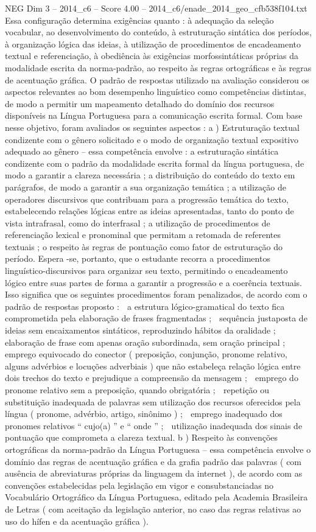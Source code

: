 \begin{textsample}{NEG Dim 3 – 2014\_c6 – Score 4.00 – 2014\_c6/enade\_2014\_geo\_cfb538f104.txt}
Essa configuração determina exigências quanto : à adequação da seleção vocabular, ao desenvolvimento do conteúdo, à estruturação sintática dos períodos, à organização lógica das ideias, à utilização de procedimentos de encadeamento textual e referenciação, à obediência às exigências morfossintáticas próprias da modalidade escrita da norma-padrão, ao respeito às regras ortográficas e às regras de acentuação gráfica.
O padrão de respostas utilizado na avaliação considerou os aspectos relevantes ao bom desempenho linguístico como competências distintas, de modo a permitir um mapeamento detalhado do domínio dos recursos disponíveis na Língua Portuguesa para a comunicação escrita formal.
Com base nesse objetivo, foram avaliados os seguintes aspectos : a ) Estruturação textual condizente com o gênero solicitado e o modo de organização textual expositivo adequado ao gênero – essa competência envolve : a estruturação sintática condizente com o padrão da modalidade escrita formal da língua portuguesa, de modo a garantir a clareza necessária ; a distribuição do conteúdo do texto em parágrafos, de modo a garantir a sua organização temática ; a utilização de operadores discursivos que contribuam para a progressão temática do texto, estabelecendo relações lógicas entre as ideias apresentadas, tanto do ponto de vista intrafrasal, como do interfrasal ; a utilização de procedimentos de referenciação lexical e pronominal que permitam a retomada de referentes textuais ; o respeito às regras de pontuação como fator de estruturação do período.
Espera -se, portanto, que o estudante recorra a procedimentos linguístico-discursivos para organizar seu texto, permitindo o encadeamento lógico entre suas partes de forma a garantir a progressão e a coerência textuais.
Isso significa que os seguintes procedimentos foram penalizados, de acordo com o padrão de respostas proposto :  a estrutura lógico-gramatical do texto fica comprometida pela elaboração de frases fragmentadas ;  sequência justaposta de ideias sem encaixamentos sintáticos, reproduzindo hábitos da oralidade ;  elaboração de frase com apenas oração subordinada, sem oração principal ;  emprego equivocado do conector ( preposição, conjunção, pronome relativo, alguns advérbios e locuções adverbiais ) que não estabeleça relação lógica entre dois trechos do texto e prejudique a compreensão da mensagem ;  emprego do pronome relativo sem a preposição, quando obrigatória ;  repetição ou substituição inadequada de palavras sem utilização dos recursos oferecidos pela língua ( pronome, advérbio, artigo, sinônimo ) ;  emprego inadequado dos pronomes relativos “ cujo(a) ” e “ onde ” ;  utilização inadequada dos sinais de pontuação que comprometa a clareza textual. b ) Respeito às convenções ortográficas da norma-padrão da Língua Portuguesa – essa competência envolve o domínio das regras de acentuação gráfica e da grafia padrão das palavras ( com ausência de abreviaturas próprias da linguagem da internet ), de acordo com as convenções estabelecidas pela legislação em vigor e consubstanciadas no Vocabulário Ortográfico da Língua Portuguesa, editado pela Academia Brasileira de Letras ( com aceitação da legislação anterior, no caso das regras relativas ao uso do hífen e da acentuação gráfica ).

\end{textsample}
